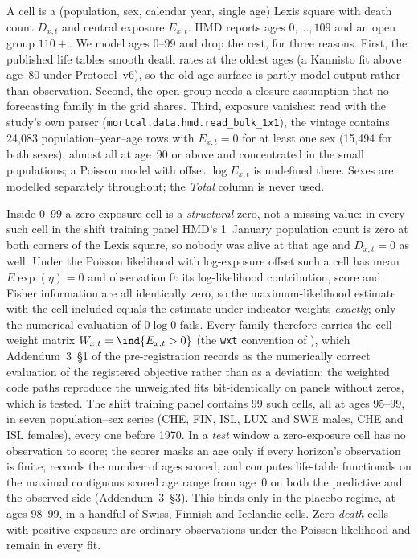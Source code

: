 A cell is a (population, sex, calendar year, single age) Lexis square with
death count $D_{x,t}$ and central exposure $E_{x,t}$. HMD reports ages
$0,\dots,109$ and an open group $110{+}$. We model ages $0$--$99$ and drop
the rest, for three reasons. First, the published life tables smooth death
rates at the oldest ages (a Kannisto fit above age~80 under Protocol~v6), so
the old-age surface is partly model output rather than observation. Second,
the open group needs a closure assumption that no forecasting family in the
grid shares. Third, exposure vanishes: read with the study's own parser
(\texttt{mortcal.data.hmd.read\_bulk\_1x1}), the vintage contains 24{,}083
population--year--age rows with $E_{x,t}=0$ for at least one sex (15{,}494
for both sexes), almost all at age~90 or above and concentrated in the
small populations; a Poisson model with offset $\log E_{x,t}$ is undefined
there. Sexes are modelled separately throughout; the \emph{Total} column is
never used.

Inside $0$--$99$ a zero-exposure cell is a \emph{structural} zero, not a
missing value: in every such cell in the shift training panel HMD's
1~January population count is zero at both corners of the Lexis square, so
nobody was alive at that age and $D_{x,t}=0$ as well. Under the Poisson
likelihood with log-exposure offset such a cell has mean $E\exp(\eta)=0$
and observation $0$: its log-likelihood contribution, score and Fisher
information are all identically zero, so the maximum-likelihood estimate
with the cell included equals the estimate under indicator weights
\emph{exactly}; only the numerical evaluation of $0\log 0$ fails. Every
family therefore carries the cell-weight matrix $W_{x,t}=\ind\{E_{x,t}>0\}$
(the \texttt{wxt} convention of ), which Addendum~3~\S1 of the
pre-registration records as the numerically correct evaluation of the
registered objective rather than as a deviation; the weighted code paths
reproduce the unweighted fits bit-identically on panels without zeros,
which is tested. The shift training panel contains 99 such cells, all at
ages 95--99, in seven population--sex series (CHE, FIN, ISL, LUX and SWE
males, CHE and ISL females), every one before 1970. In a \emph{test}
window a zero-exposure cell has no observation to score; the scorer masks
an age only if every horizon's observation is finite, records the number of
ages scored, and computes life-table functionals on the maximal contiguous
scored age range from age~0 on both the predictive and the observed side
(Addendum~3~\S3). This binds only in the placebo regime, at ages 98--99, in
a handful of Swiss, Finnish and Icelandic cells. Zero-\emph{death} cells
with positive exposure are ordinary observations under the Poisson
likelihood and remain in every fit.

